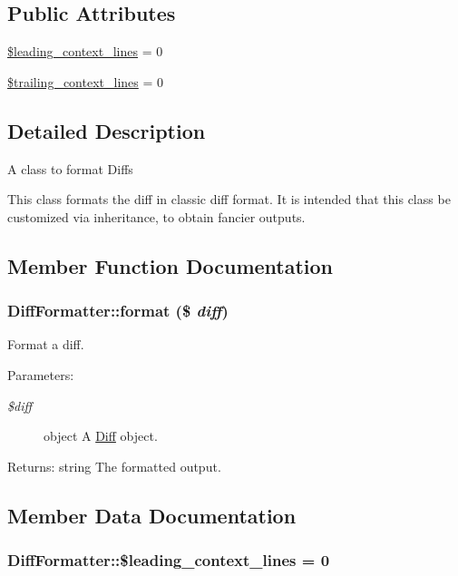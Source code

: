 \subsection*{Public Attributes}
\begin{CompactItemize}
\item 
\hyperlink{classDiffFormatter_4f2712c6e01ecb99dd67318a423befa1}{\$leading\_\-context\_\-lines} = 0
\item 
\hyperlink{classDiffFormatter_92c948d582a6fc85d10ee9e11393e9b2}{\$trailing\_\-context\_\-lines} = 0
\end{CompactItemize}


\subsection{Detailed Description}
A class to format Diffs

This class formats the diff in classic diff format. It is intended that this class be customized via inheritance, to obtain fancier outputs. 

\subsection{Member Function Documentation}
\hypertarget{classDiffFormatter_5c24d365dc779a9825c26c8a2977590a}{
\subsubsection[{format}]{\setlength{\rightskip}{0pt plus 5cm}DiffFormatter::format (\$ {\em diff})}}
\label{classDiffFormatter_5c24d365dc779a9825c26c8a2977590a}


Format a diff.

\begin{Desc}
\item[Parameters:]
\begin{description}
\item[{\em \$diff}]object A \hyperlink{classDiff}{Diff} object. \end{description}
\end{Desc}
\begin{Desc}
\item[Returns:]string The formatted output. \end{Desc}


\subsection{Member Data Documentation}
\hypertarget{classDiffFormatter_4f2712c6e01ecb99dd67318a423befa1}{
\subsubsection[{\$leading\_\-context\_\-lines}]{\setlength{\rightskip}{0pt plus 5cm}DiffFormatter::\$leading\_\-context\_\-lines = 0}}
\label{classDiffFormatter_4f2712c6e01ecb99dd67318a423befa1}


